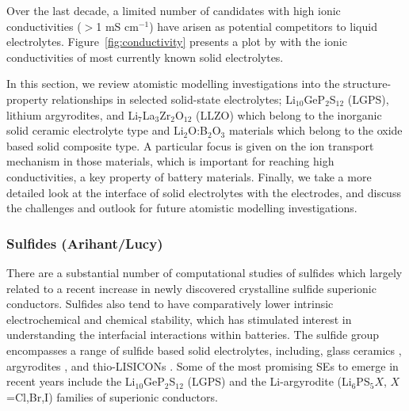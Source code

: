 \documentclass[../main.tex]{subfiles}
\begin{document}
Over the last decade, a limited number of candidates with high ionic conductivities ($>$1 mS cm$^{-1}$) have arisen as potential competitors to liquid electrolytes.\cite{kanno_synthesis_2000, murayama_synthesis_2002, murayama_material_2004, minafra_influence_2019,bron_li_2013,whiteley_empowering_2014,huang_superionic_2019,yamane_crystal_2007,homma_crystal_2011} Figure~\ref{fig:conductivity} presents a plot by \citeauthor{Kamaya2011} with the ionic conductivities of most currently known solid electrolytes.\cite{Kamaya2011}

In this section, we review atomistic modelling investigations into the structure-property relationships in selected solid-state electrolytes; Li$_{10}$GeP$_2$S$_{12}$ (LGPS), lithium argyrodites, and Li$_7$La$_3$Zr$_2$O$_{12}$ (LLZO) which belong to the inorganic solid ceramic electrolyte type and Li$_{2}$O:B$_{2}$O$_{3}$ materials which belong to the oxide based solid composite type. A particular focus is given on the ion transport mechanism in those materials, which is important for reaching high conductivities, a key property of battery materials. Finally, we take a more detailed look at the interface of solid electrolytes with the electrodes, and discuss the challenges and outlook for future atomistic modelling investigations.

\subsubsection{Sulfides (Arihant/Lucy)}
There are a substantial number of computational studies of sulfides which largely related to a recent increase in newly discovered crystalline sulfide superionic conductors. Sulfides also tend to have comparatively lower intrinsic electrochemical and chemical stability, which has stimulated interest in understanding the interfacial interactions within batteries. \cite{Xiao2020interfacerev} The sulfide group encompasses a range of sulfide based solid electrolytes, including, glass ceramics \cite{minami2006recent}, argyrodites \cite{bai2020research}, and thio-LISICONs \cite{minafra2020two}. Some of the most promising SEs to emerge in recent years include the Li$_{10}$GeP$_2$S$_{12}$ (LGPS) \cite{Bhandari2016,Kamaya2011,Mo2012} and the Li-argyrodite (Li$_6$PS$_{5}X$, $X$=Cl,Br,I) \cite{kraft2018,deiseroth_li6ps5x_2008,deklerk2016,kraft2017,minafra2018,adeli2019} families of superionic conductors.
\end{document}
